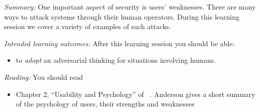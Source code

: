 \emph{Summary:}
One important aspect of security is users' weaknesses.
There are many ways to attack systems through their human operators.
During this learning session we cover a variety of examples of such attacks.

\emph{Intended learning outcomes:}
After this learning session you should be able:
\begin{itemize}
  \item to \emph{adopt} an adversarial thinking for situations involving 
    humans.
\end{itemize}

\emph{Reading:}
You should read
\begin{itemize}
  \item Chapter 2, \enquote{Usability and Psychology} of 
    ~\cite{Anderson2008sea}.
    Anderson gives a short summary of the psychology of users, their strengths 
    and weaknesses
\end{itemize}
